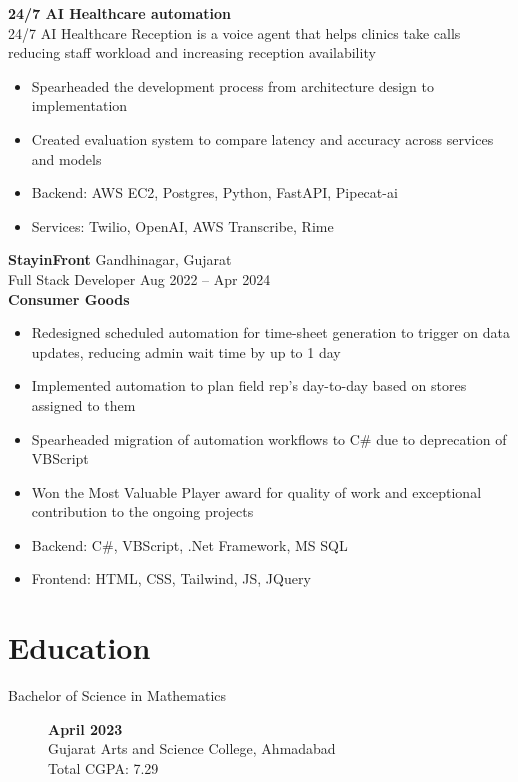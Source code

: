 \documentclass[a4paper]{article}
\begin{document}
\noindent
\textbf{24/7 AI Healthcare automation} \\
24/7 AI Healthcare Reception is a voice agent that helps clinics take calls reducing staff workload and increasing reception availability
\begin{itemize}
	\item Spearheaded the development process from architecture design to implementation
	\item Created evaluation system to compare latency and accuracy across services and models
	\item Backend: AWS EC2, Postgres, Python, FastAPI, Pipecat-ai
	\item Services: Twilio, OpenAI, AWS Transcribe, Rime
\end{itemize}


\noindent
\textbf{StayinFront} \hfill Gandhinagar, Gujarat \\
Full Stack Developer \hfill Aug 2022 -- Apr 2024 \\
\textbf{Consumer Goods}
\begin{itemize}
	\item Redesigned scheduled automation for time-sheet generation to trigger on data updates, reducing admin wait time by up to 1 day
	\item Implemented automation to plan field rep's day-to-day based on stores assigned to them
	\item Spearheaded migration of automation workflows to C\# due to deprecation of VBScript
	\item Won the Most Valuable Player award for quality of work and exceptional contribution to the ongoing projects
	\item Backend: C\#, VBScript, .Net Framework, MS SQL
	\item Frontend: HTML, CSS, Tailwind, JS, JQuery
\end{itemize}

\section{Education}

\begin{description}
	\item[Bachelor of Science in Mathematics ] \hfill  \textbf{April 2023} \\
	      Gujarat Arts and Science College, Ahmadabad
	      \\ Total CGPA\@: 7.29
\end{description}
\end{document}
